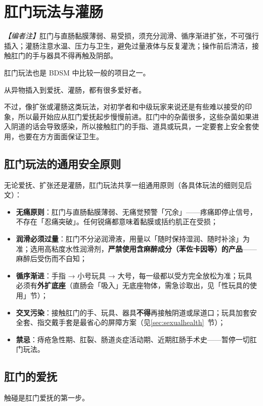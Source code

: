 \documentclass[12pt,UTF8]{ctexbook}
\begin{document}
\section{肛门玩法与灌肠}

\noindent\textit{【编者注】}肛门与直肠黏膜薄弱、易受损，须充分润滑、循序渐进扩张，不可强行插入；灌肠注意水温、压力与卫生，避免过量液体与反复灌洗；操作前后清洁，接触肛门的手与器具不得再触及阴部。

肛门玩法也是 BDSM 中比较一般的项目之一。

从异物插入到爱抚、灌肠，都有很多爱好者。

不过，像扩张或灌肠这类玩法，对初学者和中级玩家来说还是有些难以接受的印象，所以最开始应从肛门爱抚起步慢慢前进。肛门中的杂菌很多，这些杂菌如果进入阴道的话会导致感染，所以接触肛门的手指、道具或玩具，一定要套上安全套使用，也要在方方面面保证卫生。

\subsection{肛门玩法的通用安全原则}

无论爱抚、扩张还是灌肠，肛门玩法共享一组通用原则（各具体玩法的细则见后文）：

\begin{itemize}
\item \textbf{无痛原则}：肛门与直肠黏膜薄弱、无痛觉预警「冗余」——疼痛即停止信号，不存在「忍痛突破」。任何锐痛都意味着黏膜或括约肌正在受损；
\item \textbf{润滑必须过量}：肛门不分泌润滑液，用量以「随时保持湿润、随时补涂」为准；选用高粘度水性润滑剂，\textbf{严禁使用含麻醉成分（苯佐卡因等）的产品}——麻醉后受伤而不自知；
\item \textbf{循序渐进}：手指 → 小号玩具 → 大号，每一级都以受方完全放松为准；玩具必须有\textbf{外扩底座}（直肠会「吸入」无底座物体，需急诊取出，见「性玩具的使用」节）；
\item \textbf{交叉污染}：接触肛门的手、玩具、器具\textbf{不得}再接触阴道或尿道口；玩具加套安全套、指交戴手套是最省心的屏障方案（见\ref{sec:sexualhealth}~节）；
\item \textbf{禁忌}：痔疮急性期、肛裂、肠道炎症活动期、近期肛肠手术史——暂停一切肛门玩法。
\end{itemize}

\subsection{肛门的爱抚}

触碰是肛门爱抚的第一步。
\end{document}
